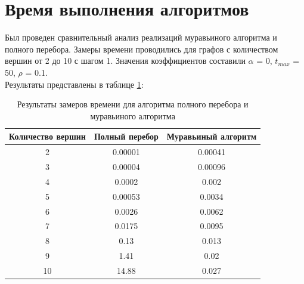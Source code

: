 \documentclass[a4paper,oneside,14pt]{extreport}
\begin{document}
\section{Время выполнения алгоритмов}
Был проведен сравнительный анализ реализаций муравьиного алгоритма и полного перебора. Замеры времени проводились для графов с количеством вершин от 2 до 10 с шагом 1. Значения коэффициентов составили $\alpha$ = 0, $t_{max}$ = 50, $\rho$ = 0.1.\\
Результаты представлены в таблице \ref{tab2}:\\

\begin{table}[H]
	\caption{Результаты замеров времени для алгоритма полного перебора и муравьиного алгоритма}
	\begin{center}
		\label{tab2}
		\begin{tabular}{|c|c|c|}
			\hline
			Количество вершин &Полный перебор& Муравьиный алгоритм \\\hline
			2&0.00001&0.00041\\
			3&0.00004&0.00096\\
			4&0.0002&0.002\\
			5&0.00053&0.0034\\
			6&0.0026&0.0062\\
			7&0.0175&0.0095\\
			8&0.13&0.013\\
			9&1.41&0.02\\
			10&14.88&0.027\\
			\hline
		\end{tabular}
	\end{center}
\end{table} 

\begin{center}
\end{center}
\end{document}
